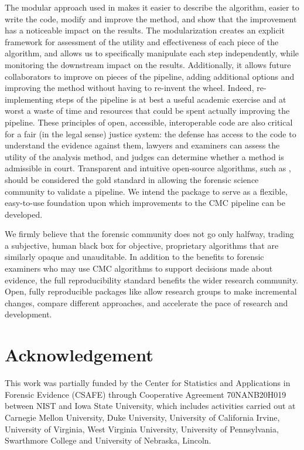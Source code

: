 The modular approach used in  makes it easier to describe
the algorithm, easier to write the code, modify and improve the method,
and show that the improvement has a noticeable impact on the results.
The modularization creates an explicit framework for assessment of the
utility and effectiveness of each piece of the algorithm, and allows us
to specifically manipulate each step independently, while monitoring the
downstream impact on the results. Additionally, it allows future
collaborators to improve on pieces of the pipeline, adding additional
options and improving the method without having to re-invent the wheel.
Indeed, re-implementing steps of the pipeline is at best a useful
academic exercise and at worst a waste of time and resources that could
be spent actually improving the pipeline. These principles of open,
accessible, interoperable code are also critical for a fair (in the
legal sense) justice system: the defense has access to the code to
understand the evidence against them, lawyers and examiners can assess
the utility of the analysis method, and judges can determine whether a
method is admissible in court. Transparent and intuitive open-source
algorithms, such as , should be considered the gold
standard in allowing the forensic science community to validate a
pipeline. We intend the  package to serve as a flexible,
easy-to-use foundation upon which improvements to the CMC pipeline can
be developed.

We firmly believe that the forensic community does not go only halfway,
trading a subjective, human black box for objective, proprietary
algorithms that are similarly opaque and unauditable. In addition to the
benefits to forensic examiners who may use CMC algorithms to support
decisions made about evidence, the full reproducibility standard
benefits the wider research community. Open, fully reproducible packages
like  allow research groups to make incremental changes,
compare different approaches, and accelerate the pace of research and
development.

\hypertarget{acknowledgement}{%
\section{Acknowledgement}\label{acknowledgement}}

This work was partially funded by the Center for Statistics and
Applications in Forensic Evidence (CSAFE) through Cooperative Agreement
70NANB20H019 between NIST and Iowa State University, which includes
activities carried out at Carnegie Mellon University, Duke University,
University of California Irvine, University of Virginia, West Virginia
University, University of Pennsylvania, Swarthmore College and
University of Nebraska, Lincoln.

